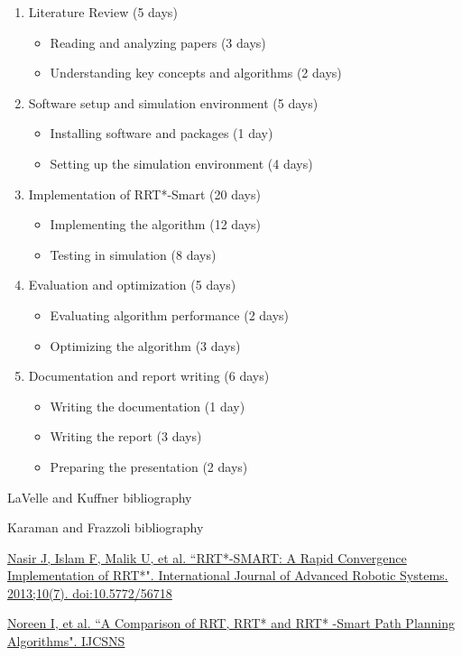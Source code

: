 \documentclass[12pt]{extarticle}
\begin{document}
\begin{enumerate}
	\item Literature Review (5 days)
	\begin{itemize}
		\item Reading and analyzing papers (3 days)
		\item Understanding key concepts and algorithms (2 days)
	\end{itemize}
	
	\item Software setup and simulation environment (5 days)
	\begin{itemize}
		\item Installing software and packages (1 day)
		\item Setting up the simulation environment (4 days)
	\end{itemize}
	
	\item Implementation of RRT*-Smart (20 days)
	\begin{itemize}
		\item Implementing the algorithm (12 days)
		\item Testing in simulation (8 days)
	\end{itemize}

	\item Evaluation and optimization (5 days)
	\begin{itemize}
		\item Evaluating algorithm performance (2 days)
		\item Optimizing the algorithm (3 days)
	\end{itemize}

	\item Documentation and report writing (6 days)
	\begin{itemize}
		\item Writing the documentation (1 day)
		\item Writing the report (3 days)
		\item Preparing the presentation (2 days)
	\end{itemize}
\end{enumerate}
\newpage
\begin{thebibliography}{9}
	LaVelle and Kuffner bibliography

	Karaman and Frazzoli bibliography
	
	\href{https://journals.sagepub.com/doi/10.5772/56718}{Nasir J, Islam F, Malik U, et al. ``RRT*-SMART: A Rapid Convergence Implementation of RRT*". International Journal of Advanced Robotic Systems. 2013;10(7). doi:10.5772/56718}
	
	\href{http://paper.ijcsns.org/07_book/201610/20161004.pdf}{Noreen I, et al. ``A Comparison of RRT, RRT* and RRT* -Smart Path Planning Algorithms". IJCSNS}
\end{thebibliography}
\end{document}
